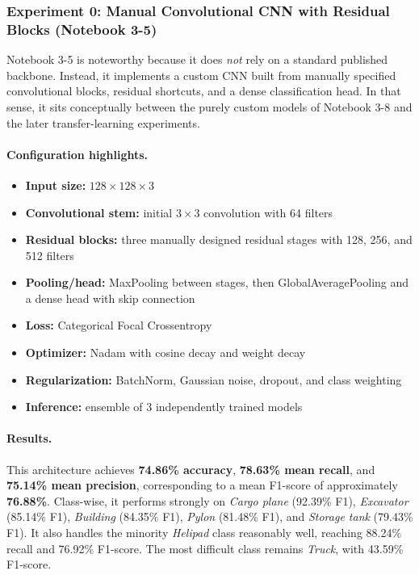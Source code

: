 \subsubsection{Experiment 0: Manual Convolutional CNN with Residual Blocks (Notebook 3-5)}

Notebook 3-5 is noteworthy because it does \emph{not} rely on a standard published backbone. Instead, it implements a custom CNN built from manually specified convolutional blocks, residual shortcuts, and a dense classification head. In that sense, it sits conceptually between the purely custom models of Notebook 3-8 and the later transfer-learning experiments.

\paragraph{Configuration highlights.}
\begin{itemize}
    \item \textbf{Input size:} $128 \times 128 \times 3$
    \item \textbf{Convolutional stem:} initial $3 \times 3$ convolution with 64 filters
    \item \textbf{Residual blocks:} three manually designed residual stages with 128, 256, and 512 filters
    \item \textbf{Pooling/head:} MaxPooling between stages, then GlobalAveragePooling and a dense head with skip connection
    \item \textbf{Loss:} Categorical Focal Crossentropy
    \item \textbf{Optimizer:} Nadam with cosine decay and weight decay
    \item \textbf{Regularization:} BatchNorm, Gaussian noise, dropout, and class weighting
    \item \textbf{Inference:} ensemble of 3 independently trained models
\end{itemize}

\paragraph{Results.} This architecture achieves \textbf{74.86\% accuracy}, \textbf{78.63\% mean recall}, and \textbf{75.14\% mean precision}, corresponding to a mean F1-score of approximately \textbf{76.88\%}. Class-wise, it performs strongly on \textit{Cargo plane} (92.39\% F1), \textit{Excavator} (85.14\% F1), \textit{Building} (84.35\% F1), \textit{Pylon} (81.48\% F1), and \textit{Storage tank} (79.43\% F1). It also handles the minority \textit{Helipad} class reasonably well, reaching 88.24\% recall and 76.92\% F1-score. The most difficult class remains \textit{Truck}, with 43.59\% F1-score.

